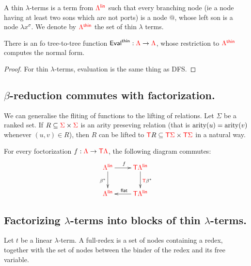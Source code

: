 \begin{definition}
A thin $\lambda$-terms is a term from ${\color{red}{\Lambda^{\sf{lin}}}}$ such that every branching node (ie a node having at least two sons which are not ports) is a node $\text{@}$, whose left son is a node $\lambda x^\sigma$. We denote by ${\color{red}{\Lambda^{\sf{thin}}}}$ the set of thin $\lambda$ terms.
\end{definition}

\begin{proposition}
There is an fo tree-to-tree function ${\sf{Eval}^{\sf{thin}}}:{\color{red}{\Lambda}}\to{\color{red}{\Lambda}}$, whose restriction to ${\color{red}{\Lambda^{\sf{thin}}}}$ computes the normal form.
\end{proposition}

\begin{proof}
For thin $\lambda$-terms, evaluation is the same thing as DFS.
\end{proof}

\subsection{$\beta$-reduction commutes with factorization.}
We can generalise the fliting of functions to the lifting of relations. 
Let $\Sigma$ be a ranked set. If $R\subseteq {\color{red}{\Sigma}}\times{\color{red}{\Sigma}}$ is an arity preseving relation (that is $\mathrm{arity}(u)=\mathrm{arity}(v)$ whenever $(u,v)\in R$), then $R$ can be lifted to ${\color{red}{\mathsf T}} R\subseteq {\color{red}{{\color{red}{\mathsf T}}\Sigma}} \times {\color{red}{{\color{red}{\mathsf T}}\Sigma}}$ in a natural way. 

\begin{proposition}
For every foctorization $f:{\color{red}{\Lambda}} \to {\color{red}{\mathsf T}} {\color{red}{\Lambda}}$, the following diagram commutes:
\begin{align*}
        \xymatrix{
     \rlambdalin \ar[d]_{\beta^*}\ar[r]^f& \tmonad \rlambdalin \ar[d]^{\tmonad\beta^*} \\
           \rlambdalin  &\ar[l]_{\sf{flat}} \tmonad \rlambdalin
        }
        \end{align*}
\end{proposition}



\subsection{Factorizing $\lambda$-terms into blocks of thin $\lambda$-terms.}

\begin{definition}
Let $t$ be a linear $\lambda$-term. A full-redex is a set of nodes  containing a redex, together with the set of nodes between the binder of the redex and its free variable.  
\end{definition}

